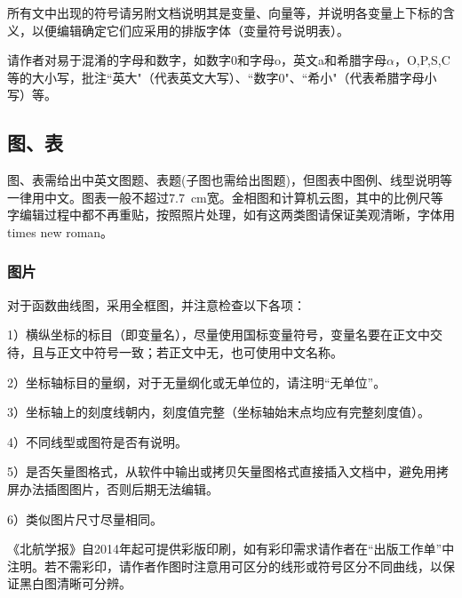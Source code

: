 \documentclass[10.5pt,twocolumn]{jbuaa}
\begin{document}
所有文中出现的符号请另附文档说明其是变量、向量等，并说明各变量上下标的含义，以便编辑确定它们应采用的排版字体（变量符号说明表）。

请作者对易于混淆的字母和数字，如数字0和字母o，英文a和希腊字母$\alpha$，O,P,S,C等的大小写，批注``英大"（代表英文大写）、``数字0"、``希小"（代表希腊字母小写）等。

\subsection{图、表}
图、表需给出中英文图题、表题(子图也需给出图题)，但图表中图例、线型说明等一律用中文。图表一般不超过7.7\ cm宽。金相图和计算机云图，其中的比例尺等字编辑过程中都不再重贴，按照照片处理，如有这两类图请保证美观清晰，字体用times new roman。

\subsubsection{图片}
对于函数曲线图，采用全框图，并注意检查以下各项：

1）横纵坐标的标目（即变量名），尽量使用国标变量符号，变量名要在正文中交待，且与正文中符号一致；若正文中无，也可使用中文名称。

2）坐标轴标目的量纲，对于无量纲化或无单位的，请注明``无单位”。

3）坐标轴上的刻度线朝内，刻度值完整（坐标轴始末点均应有完整刻度值）。

4）不同线型或图符是否有说明。

5）是否矢量图格式，从软件中输出或拷贝矢量图格式直接插入文档中，避免用拷屏办法插图图片，否则后期无法编辑。

6）类似图片尺寸尽量相同。

《北航学报》自2014年起可提供彩版印刷，如有彩印需求请作者在“出版工作单”中注明。若不需彩印，请作者作图时注意用可区分的线形或符号区分不同曲线，以保证黑白图清晰可分辨。 
\end{document}
